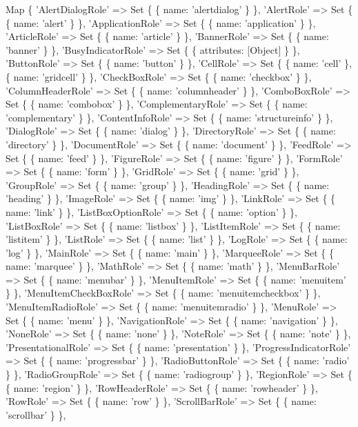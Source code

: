 \begin{DoxyCode}
Map \{
  'AlertDialogRole' => Set \{ \{ name: 'alertdialog' \} \},
  'AlertRole' => Set \{ \{ name: 'alert' \} \},
  'ApplicationRole' => Set \{ \{ name: 'application' \} \},
  'ArticleRole' => Set \{ \{ name: 'article' \} \},
  'BannerRole' => Set \{ \{ name: 'banner' \} \},
  'BusyIndicatorRole' => Set \{ \{ attributes: [Object] \} \},
  'ButtonRole' => Set \{ \{ name: 'button' \} \},
  'CellRole' => Set \{ \{ name: 'cell' \}, \{ name: 'gridcell' \} \},
  'CheckBoxRole' => Set \{ \{ name: 'checkbox' \} \},
  'ColumnHeaderRole' => Set \{ \{ name: 'columnheader' \} \},
  'ComboBoxRole' => Set \{ \{ name: 'combobox' \} \},
  'ComplementaryRole' => Set \{ \{ name: 'complementary' \} \},
  'ContentInfoRole' => Set \{ \{ name: 'structureinfo' \} \},
  'DialogRole' => Set \{ \{ name: 'dialog' \} \},
  'DirectoryRole' => Set \{ \{ name: 'directory' \} \},
  'DocumentRole' => Set \{ \{ name: 'document' \} \},
  'FeedRole' => Set \{ \{ name: 'feed' \} \},
  'FigureRole' => Set \{ \{ name: 'figure' \} \},
  'FormRole' => Set \{ \{ name: 'form' \} \},
  'GridRole' => Set \{ \{ name: 'grid' \} \},
  'GroupRole' => Set \{ \{ name: 'group' \} \},
  'HeadingRole' => Set \{ \{ name: 'heading' \} \},
  'ImageRole' => Set \{ \{ name: 'img' \} \},
  'LinkRole' => Set \{ \{ name: 'link' \} \},
  'ListBoxOptionRole' => Set \{ \{ name: 'option' \} \},
  'ListBoxRole' => Set \{ \{ name: 'listbox' \} \},
  'ListItemRole' => Set \{ \{ name: 'listitem' \} \},
  'ListRole' => Set \{ \{ name: 'list' \} \},
  'LogRole' => Set \{ \{ name: 'log' \} \},
  'MainRole' => Set \{ \{ name: 'main' \} \},
  'MarqueeRole' => Set \{ \{ name: 'marquee' \} \},
  'MathRole' => Set \{ \{ name: 'math' \} \},
  'MenuBarRole' => Set \{ \{ name: 'menubar' \} \},
  'MenuItemRole' => Set \{ \{ name: 'menuitem' \} \},
  'MenuItemCheckBoxRole' => Set \{ \{ name: 'menuitemcheckbox' \} \},
  'MenuItemRadioRole' => Set \{ \{ name: 'menuitemradio' \} \},
  'MenuRole' => Set \{ \{ name: 'menu' \} \},
  'NavigationRole' => Set \{ \{ name: 'navigation' \} \},
  'NoneRole' => Set \{ \{ name: 'none' \} \},
  'NoteRole' => Set \{ \{ name: 'note' \} \},
  'PresentationalRole' => Set \{ \{ name: 'presentation' \} \},
  'ProgressIndicatorRole' => Set \{ \{ name: 'progressbar' \} \},
  'RadioButtonRole' => Set \{ \{ name: 'radio' \} \},
  'RadioGroupRole' => Set \{ \{ name: 'radiogroup' \} \},
  'RegionRole' => Set \{ \{ name: 'region' \} \},
  'RowHeaderRole' => Set \{ \{ name: 'rowheader' \} \},
  'RowRole' => Set \{ \{ name: 'row' \} \},
  'ScrollBarRole' => Set \{ \{ name: 'scrollbar' \} \},

\end{DoxyCode}
